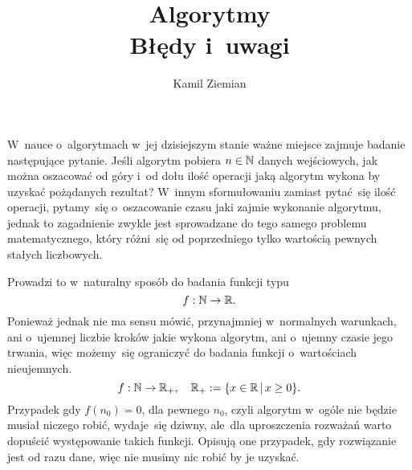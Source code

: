 \documentclass[a4paper,11pt]{article}
\title{Algorytmy \\
  {\Large Błędy i~uwagi}}
\author{Kamil Ziemian}
\begin{document}





\maketitle  %






\vspace{0em}



\vspace{0em}


\noindent W~nauce o~algorytmach w~jej dzisiejszym stanie ważne miejsce
zajmuje badanie następujące pytanie. Jeśli algorytm pobiera $n \in \mathbb{N}$
danych wejściowych, jak można oszacować od góry i~od dołu ilość operacji
jaką algorytm wykona by uzyskać pożądanych rezultat? W~innym sformułowaniu
zamiast pytać~się ilość operacji, pytamy~się o~oszacowanie czasu jaki zajmie
wykonanie algorytmu, jednak to zagadnienie zwykle jest sprowadzane do tego
samego problemu matematycznego, który różni~się od poprzedniego tylko
wartością pewnych stałych liczbowych.

Prowadzi to w~naturalny sposób do badania funkcji typu
\begin{equation}
  \label{eq:CormenAtAl-WprowadzenieDoAlgorytmow-01}
  f : \mathbb{N} \to \mathbb{R}.
\end{equation}
Ponieważ jednak nie ma sensu mówić, przynajmniej w~normalnych warunkach, ani
o~ujemnej liczbie kroków jakie wykona algorytm, ani o~ujemny czasie jego
trwania, więc możemy~się ograniczyć do badania funkcji o~wartościach
nieujemnych.
\begin{equation}
  \label{eq:CormenAtAl-WprowadzenieDoAlgorytmow-02}
  f : \mathbb{N} \to \mathbb{R}_{ + }, \quad
  \mathbb{R}_{ + } := \{ x \in \mathbb{R} \, | \, x \geq 0 \}.
\end{equation}
Przypadek gdy $f( n_{ 0 } ) = 0$, dla pewnego $n_{ 0 }$, czyli algorytm
w~ogóle nie będzie musiał niczego robić, wydaje~się dziwny, ale~dla
uproszczenia rozważań warto dopuścić występowanie takich funkcji. Opisują
one przypadek, gdy rozwiązanie jest od razu dane, więc nie musimy nic robić
by je uzyskać.
\end{document}
